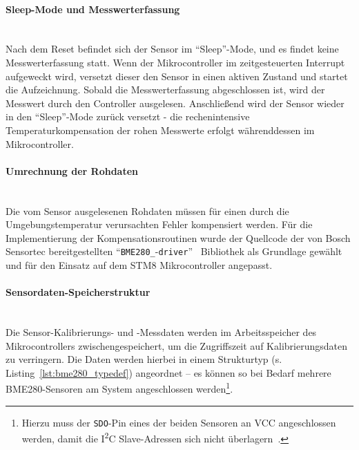             \paragraph{Sleep-Mode und Messwerterfassung}\mbox{}\\
            Nach dem Reset befindet sich der Sensor im ``Sleep''-Mode, und es findet keine Messwerterfassung statt. Wenn der Mikrocontroller im zeitgesteuerten Interrupt aufgeweckt wird, versetzt dieser den Sensor in einen aktiven Zustand und startet die Aufzeichnung. Sobald die Messwerterfassung abgeschlossen ist, wird der Messwert durch den Controller ausgelesen. Anschließend wird der Sensor wieder in den ``Sleep''-Mode zurück versetzt - die rechenintensive Temperaturkompensation der rohen Messwerte erfolgt währenddessen im Mikrocontroller.
            
            \paragraph{Umrechnung der Rohdaten}\mbox{}\\
            Die vom Sensor ausgelesenen Rohdaten müssen für einen durch die Umgebungstemperatur verursachten Fehler kompensiert werden. Für die Implementierung der Kompensationsroutinen wurde der Quellcode der von Bosch Sensortec bereitgestellten ``\texttt{BME280\_}-\texttt{driver}''~\cite{bst_bme280_drv} Bibliothek als Grundlage gewählt und für den Einsatz auf dem STM8 Mikrocontroller angepasst.
            
            \paragraph{Sensordaten-Speicherstruktur}\mbox{}\\
            Die Sensor-Kalibrierungs- und -Messdaten werden im Arbeitsspeicher des Mikrocontrollers zwischengespeichert, um die Zugriffszeit auf Kalibrierungsdaten zu verringern. Die Daten werden hierbei in einem Strukturtyp (s. Listing~\ref{lst:bme280_typedef}) angeordnet -- es können so bei Bedarf mehrere BME280-Sensoren am System angeschlossen werden\footnote{Hierzu muss der \texttt{SDO}-Pin eines der beiden Sensoren an VCC angeschlossen werden, damit die I\textsuperscript{2}C Slave-Adressen sich nicht überlagern~\cite[Kap 6.3]{ds_bme280}.}.
            
